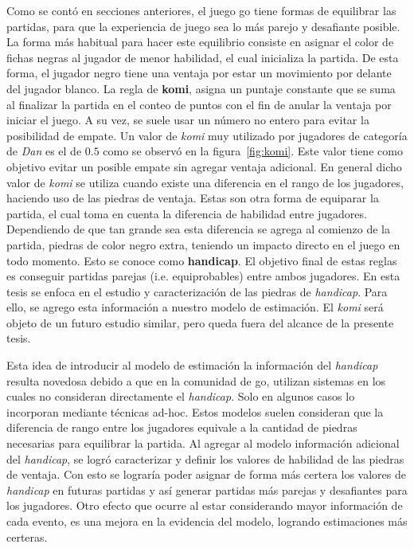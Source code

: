 \documentclass[11pt,twoside,spanish]{report} %
\begin{document}
Como se cont\'o en secciones anteriores, el juego go tiene formas de equilibrar las partidas, para que la experiencia de juego sea lo m\'as parejo y desafiante posible.
La forma m\'as habitual para hacer este equilibrio consiste en asignar el color de fichas negras al jugador de menor habilidad, el cual inicializa la partida.
De esta forma, el jugador negro tiene una ventaja por estar un movimiento por delante del jugador blanco.
La regla de \textbf{komi}, asigna un puntaje constante que se suma al finalizar la partida en el conteo de puntos con el fin de anular la ventaja por iniciar el juego.
A su vez, se suele usar un n\'umero no entero para evitar la posibilidad de empate.
Un valor de \emph{komi} muy utilizado por jugadores de categor\'ia de \textit{Dan} es el de $0.5$  como se observ\'o en la figura~\ref{fig:komi}.
Este valor tiene como objetivo evitar un posible empate sin agregar ventaja adicional.
En general dicho valor de \textit{komi} se utiliza cuando existe una diferencia en el rango de los jugadores, haciendo uso de las piedras de ventaja.
Estas son otra forma de equiparar la partida, el cual toma en cuenta la diferencia de habilidad entre jugadores.
Dependiendo de que tan grande sea esta diferencia se agrega al comienzo de la partida, piedras de color negro extra, teniendo un impacto directo en el juego en todo momento. 
Esto se conoce como \textbf{handicap}.
El objetivo final de estas reglas es conseguir partidas parejas (i.e. equiprobables) entre ambos jugadores.
En esta tesis se enfoca en el estudio y caracterizaci\'on de las piedras de \textit{handicap}.
Para ello, se agrego esta informaci\'on a nuestro modelo de estimaci\'on.
El \textit{komi} ser\'a objeto de un futuro estudio similar, pero queda fuera del alcance de la presente tesis.


Esta idea de introducir al modelo de estimaci\'on la informaci\'on del \textit{handicap} resulta novedosa debido a que en la comunidad de go, utilizan sistemas en los cuales no consideran directamente el \emph{handicap}.
Solo en algunos casos lo incorporan mediante t\'ecnicas ad-hoc.
Estos modelos suelen consideran que la diferencia de rango entre los jugadores equivale a la cantidad de piedras necesarias para equilibrar la partida.
Al agregar al modelo informaci\'on adicional del \textit{handicap}, se logr\'o caracterizar y definir los valores de habilidad de las piedras de ventaja.
Con esto se lograr\'ia poder asignar de forma m\'as certera los valores de \textit{handicap} en futuras partidas y as\'i generar partidas  m\'as parejas y desafiantes para los jugadores.
Otro efecto que ocurre al estar considerando mayor informaci\'on de cada evento, es una mejora en la evidencia del modelo, logrando estimaciones m\'as certeras.
\end{document}
